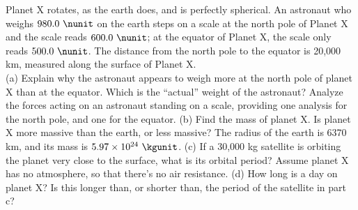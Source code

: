 Planet X rotates, as the earth does, and is perfectly spherical. An
astronaut who weighs $980.0\ \nunit$ on the earth steps on a scale at
the north pole of Planet X and the scale reads $600.0\ \nunit$; at
the equator of Planet X, the scale only reads $500.0\ \nunit$. The
distance from the north pole to the equator is 20,000 km, measured
along the surface of Planet X.\\
%
(a) Explain why the astronaut appears to weigh more at the north pole
of planet X than at the equator. Which is the ``actual''
weight of the astronaut? Analyze the forces acting on an astronaut
standing on a scale, providing one analysis for the north pole, and one for the
equator.\hwendpart
%
(b) Find the mass of planet X. Is planet X more massive than the earth, or less
massive? The radius of the earth is 6370 km, and its mass
is $5.97 \times 10^{24}\ \kgunit$.\answercheck\hwendpart
%
(c) If a 30,000 kg satellite is orbiting the planet very close to the
surface, what is its orbital period? Assume planet X has no
atmosphere, so that there's no air resistance.\answercheck\hwendpart
%
(d) How long is a day on planet X? Is this longer than, or shorter
than, the period of the satellite in part c?\answercheck\hwendpart
